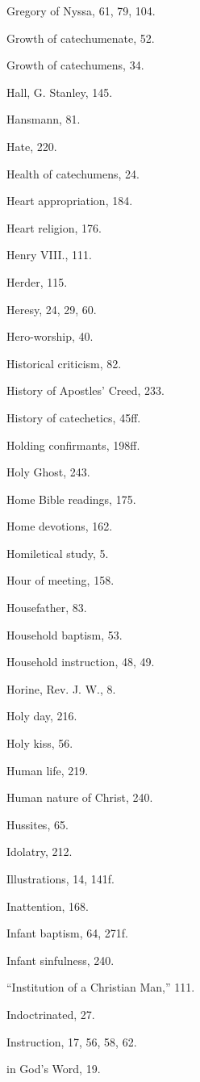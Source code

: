 \begin{originalinhalt}
Gregory of Nyssa, 61, 79, 104.

Growth of catechumenate, 52.

Growth of catechumens, 34.


Hall, G. Stanley, 145.

Hansmann, 81.

Hate, 220.

Health of catechumens, 24.

Heart appropriation, 184.

Heart religion, 176.

Henry VIII., 111.

Herder, 115.

Heresy, 24, 29, 60.

Hero-worship, 40.

Historical criticism, 82.

History of Apostles’ Creed, 233.

History of catechetics, 45ff.

Holding confirmants, 198ff.

Holy Ghost, 243.

Home Bible readings, 175.

Home devotions, 162.

Homiletical study, 5.

Hour of meeting, 158.

Housefather, 83.

Household baptism, 53.

Household instruction, 48, 49.

Horine, Rev. J. W., 8.

Holy day, 216.

Holy kiss, 56.

Human life, 219.

Human nature of Christ, 240.

Hussites, 65.


Idolatry, 212.

Illustrations, 14, 141f.

Inattention, 168.

Infant baptism, 64, 271f.

Infant sinfulness, 240.

“Institution of a Christian Man,” 111.

Indoctrinated, 27.

Instruction, 17, 56, 58, 62.

in God’s Word, 19.


\end{originalinhalt}
